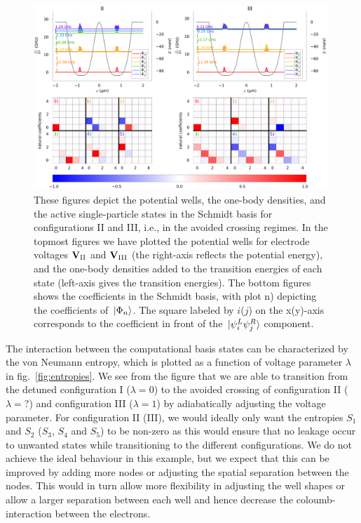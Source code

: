 \documentclass[twocolumn,superscriptaddress,unsortedaddress,
 amsmath,amssymb,
 aps,
]{revtex4-2}
\begin{document}
\begin{figure}
\includegraphics[width=0.99\textwidth]{figures/figure3_II_IIIb.pdf}
\caption{\label{fig3_II} These figures depict the potential wells, the one-body
        densities, and the active single-particle states in the Schmidt basis for configurations II and III,
        i.e., in the avoided crossing regimes.
        In the topmost figures %
        we have plotted the potential wells for electrode voltages
        $\vb{V}_{\mathrm{II}}$ and $\vb{V}_{\mathrm{III}}$ (the right-axis reflects the potential energy), and the one-body
        densities added to the transition energies of each state (left-axis gives the
        transition energies).
        The bottom figures %
        shows the coefficients in the Schmidt basis, with plot n) depicting the coefficients of $\ket*{\Phi_n}$. The square labeled by $i$($j$) on the x(y)-axis corresponds to the coefficient in front of the $\ket*{\psi_i^L\psi_j^R}$ component. }
\end{figure}


    The interaction between the computational basis states can be characterized by the von Neumann entropy, which is plotted as a function of voltage parameter $\lambda$ in fig.~\ref{fig:entropies}. We see from the figure that we are able to transition from the detuned configuration I ($\lambda = 0$) to the avoided crossing of configuration II ($\lambda = ?$) and configuration III ($\lambda = 1$) by adiabatically adjusting the voltage parameter. For configuration II (III), we would ideally only want the entropies $S_1$ and $S_2$ ($S_3$, $S_4$ and $S_5$) to be non-zero as this would ensure that no leakage occur to unwanted states while transitioning to the different configurations. We do not achieve the ideal behaviour in this example, but we expect that this can be improved by adding more nodes or adjusting the spatial separation between the nodes. This would in turn allow more flexibility in adjusting the well shapes or allow a larger separation between each well and hence decrease the coloumb-interaction between the electrons.
\end{document}
